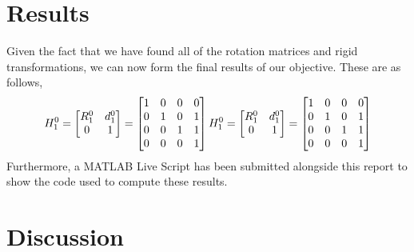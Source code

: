\documentclass[conference]{IEEEtran}
\begin{document}
\section{Results}
Given the fact that we have found all of the rotation matrices and
rigid transformations, we can now form the final results of
our objective. These are as follows,
\[
    H^0_1 = \begin{bmatrix}
        R^0_1 & d^0_1\\
        0 & 1
    \end{bmatrix}
    = \begin{bmatrix}
        1 & 0 & 0 & 0\\
        0 & 1 & 0 & 1\\
        0 & 0 & 1 & 1\\
        0 & 0 & 0 & 1
    \end{bmatrix}\\
    H^0_1 = \begin{bmatrix}
        R^0_1 & d^0_1\\
        0 & 1
    \end{bmatrix}
    = \begin{bmatrix}
        1 & 0 & 0 & 0\\
        0 & 1 & 0 & 1\\
        0 & 0 & 1 & 1\\
        0 & 0 & 0 & 1
    \end{bmatrix}
\]
Furthermore, a MATLAB Live Script has been submitted alongside
this report to show the code used to compute these results.
\section{Discussion}



\end{document}
